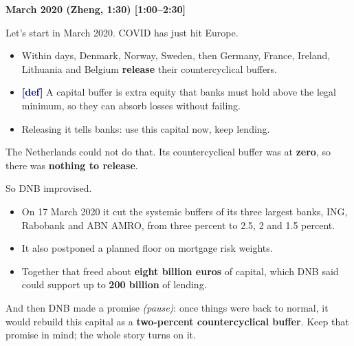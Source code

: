 {\small\textbf{March 2020 (Zheng, 1:30) [1:00–2:30]}}\par\smallskip
Let's start in March 2020. COVID has just hit Europe.
\begin{itemize}\setlength\itemsep{0pt}
\item Within days, Denmark, Norway, Sweden, then Germany, France, Ireland, Lithuania and Belgium \textbf{release} their countercyclical buffers.
\item \textcolor{navy}{\textbf{[def]}} A capital buffer is extra equity that banks must hold above the legal minimum, so they can absorb losses without failing.
\item Releasing it tells banks: use this capital now, keep lending.
\end{itemize}
\par\smallskip
The Netherlands could not do that. Its countercyclical buffer was at \textbf{zero}, so there was \textbf{nothing to release}.
\par\smallskip
So DNB improvised.
\begin{itemize}\setlength\itemsep{0pt}
\item On 17 March 2020 it cut the systemic buffers of its three largest banks, ING, Rabobank and ABN AMRO, from three percent to 2.5, 2 and 1.5 percent.
\item It also postponed a planned floor on mortgage risk weights.
\item Together that freed about \textbf{eight billion euros} of capital, which DNB said could support up to \textbf{200 billion} of lending.
\end{itemize}
\par\smallskip
And then DNB made a promise \emph{(pause)}: once things were back to normal, it would rebuild this capital as a \textbf{two-percent countercyclical buffer}. Keep that promise in mind; the whole story turns on it.
